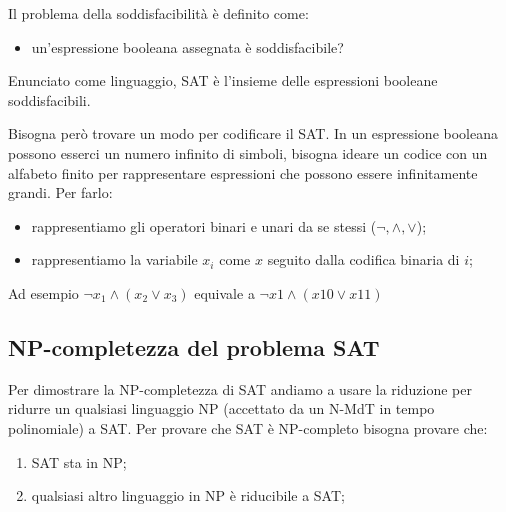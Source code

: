 \noindent Il problema della soddisfacibilità è definito come:
 \begin{itemize}
     \item un'espressione booleana assegnata è soddisfacibile?
 \end{itemize}

Enunciato come linguaggio, SAT è l'insieme delle espressioni booleane soddisfacibili. 

Bisogna però trovare un modo per codificare il SAT. 
In un espressione booleana possono esserci un numero infinito di simboli, bisogna ideare un codice con un alfabeto finito per rappresentare espressioni che possono essere infinitamente grandi. 
Per farlo: 
\begin{itemize}
    \item rappresentiamo gli operatori binari e unari da se stessi ($\lnot, \land,\lor$);
    \item rappresentiamo la variabile $x_i$ come $x$ seguito dalla codifica binaria di $i$;
\end{itemize}

\begin{example}
    Ad esempio $\lnot x_1\land (x_2\lor x_3)$ equivale a $\lnot x1 \land(x10\lor x11)$ 
\end{example}

\subsection{NP-completezza del problema SAT}
Per dimostrare la NP-completezza di SAT andiamo a usare la riduzione per ridurre un qualsiasi linguaggio NP (accettato da un N-MdT in tempo polinomiale) a SAT. Per provare che SAT è NP-completo bisogna provare che: 

\begin{enumerate}
    \item SAT sta in NP;
    \item qualsiasi altro linguaggio in NP è riducibile a SAT; 
\end{enumerate}

